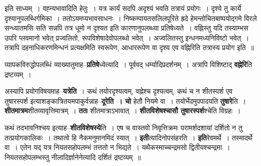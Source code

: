 \documentclass[article,12pt,a4paper]{memoir}
\begin{document}
	  \pstart इति साध्यम् । वह्न्यभावादिति हेतुः । यत्र कार्यं सदपि अदृश्यं भवति तत्रायं प्रयोगः । दृश्ये तु कार्ये दृश्यानुपलब्धिर्गमिका । ततोऽयमप्यभावसाधनः । निष्कम्पायतसलिलपूरिते ह्रदे हेमन्तोचितबाष्पयोद्गमे विरले सन्ध्यातमसि सति सन्नपि तत्र धूमो न दृश्यत इति कारणानुपलब्ध्या प्रतिषेध्यते । वह्निस्तु यदि तस्याम्भस उपरि प्लवमानो भवेत् प्रज्वलितो, रूपविशेषादेवोपलब्धो भवेत् । अज्वलितस्तु इन्धनमध्यनिविष्टो भवेत् । तत्रापि दहनाधिकरणमिन्धनं प्रत्यक्षमिति स्वरूपेण, आधाररूपेण वा दृश्य एव वह्निरिति तत्रास्य प्रयोग इति ॥
	\pend
      
	  \endgroup
	

	  \pstart व्यापकविरुद्धोपलब्धिं व्याख्यातुमाह--\textbf{प्रतिषे}ध्येत्यादि । पूर्ववद् धर्म्यादिप्रदर्शनम् । अत्रापि विशिष्टाद् \textbf{वह्नेरि}ति द्रष्टव्यम् ।
	\pend
      

	  \pstart अस्यापि प्रयोगविषयमाह--\textbf{यत्रेति} । कथं तयोरदृश्यत्वम्, वह्नेश्च दृश्यत्वम्, कथं च न शीतस्पर्श एव तुषारस्पर्श इत्याशङ्कात्रितयमपाकुर्वन्नाह--\textbf{दूरेति । चो} हेतौ नियमे वा । तयोर्भेदमुपपादयति \textbf{तुषारे}ति । \textbf{शीतमात्रम}शीतव्यावृत्तिमात्रम् । \textbf{ततः} शीतमात्राऽभावात् । \textbf{शीतविशेषश्चासौ तुषारस्पर्श}श्चेति विग्रहः ।
	\pend
      

	  \pstart कथं तदभावनिश्चय इत्याह--\textbf{शीतविशेषस्ये}ति । एष च वास्तवो निवृत्तिक्रमः परामर्शदशायां दर्शितो न तु तत्प्रयोग\leavevmode{}कालिकः । तथात्वे हि नैकमनुमानमिदं स्यात् । \textbf{इती}त्यादिनोपसंहरति । \textbf{इति}रेवमर्थे । तस्मादर्थे वा । एतेन यद् यत्र नियतसहोपलम्भं तत्ततो न भिद्यते । यथैकस्माच्चन्द्रमसो द्वितीयश्चन्द्रमा । नियतसहोपलम्भस्तु नीलादिर्ज्ञानेनेत्यादि दर्शितं द्रष्टव्यम् ॥
	\pend
      
\end{document}
